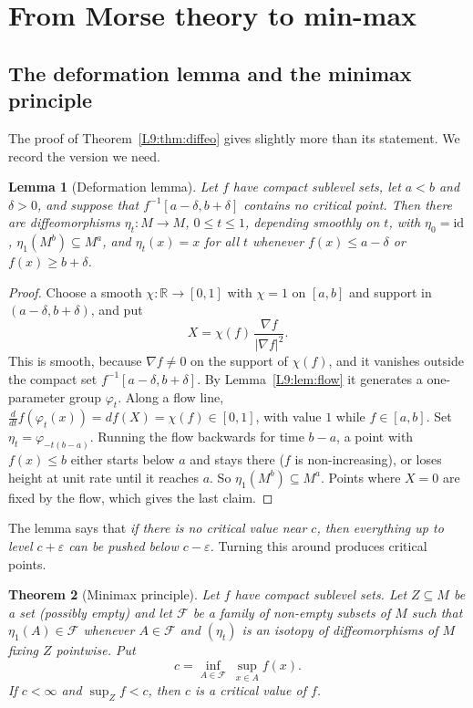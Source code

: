 \documentclass[11pt,openany]{book}
\theoremstyle{plain}
\newtheorem{theorem}{Theorem}[chapter]
\newtheorem{lemma}[theorem]{Lemma}
\theoremstyle{definition}
\theoremstyle{remark}
\newcommand{\R}{\mathbb{R}}
\newcommand{\abs}[1]{\left\lvert #1 \right\rvert}
\begin{document}
\section{From Morse theory to min-max}
\label{TOP:sec:minmax}

\subsection{The deformation lemma and the minimax principle}

The proof of Theorem~\ref{L9:thm:diffeo} gives slightly more than its statement. We record the
version we need.

\begin{lemma}[Deformation lemma]\label{TOP:lem:deform}
Let $f$ have compact sublevel sets, let $a<b$ and $\delta>0$, and suppose that $f^{-1}[a-\delta,b+\delta]$
contains no critical point. Then there are diffeomorphisms $\eta_t\colon M\to M$, $0\le t\le1$,
depending smoothly on $t$, with $\eta_0=\mathrm{id}$, $\eta_1(M^b)\subseteq M^a$, and $\eta_t(x)=x$
for all $t$ whenever $f(x)\le a-\delta$ or $f(x)\ge b+\delta$.
\end{lemma}

\begin{proof}
Choose a smooth $\chi\colon\R\to[0,1]$ with $\chi=1$ on $[a,b]$ and support in $(a-\delta,b+\delta)$, and
put
\[
  X=\chi(f)\,\frac{\nabla f}{\abs{\nabla f}^2}.
\]
This is smooth, because $\nabla f\neq0$ on the support of $\chi(f)$, and it vanishes outside the compact set
$f^{-1}[a-\delta,b+\delta]$. By Lemma~\ref{L9:lem:flow} it generates a one-parameter group $\varphi_t$. Along
a flow line, $\frac{d}{dt}f(\varphi_t(x))=df(X)=\chi(f)\in[0,1]$, with value $1$ while $f\in[a,b]$. Set
$\eta_t=\varphi_{-t(b-a)}$. Running the flow backwards for time $b-a$, a point with $f(x)\le b$ either
starts below $a$ and stays there ($f$ is non-increasing), or loses height at unit rate until it reaches
$a$. So $\eta_1(M^b)\subseteq M^a$. Points where $X=0$ are fixed by the flow, which gives the last claim.
\end{proof}

The lemma says that \emph{if there is no critical value near $c$, then everything up to level $c+\varepsilon$
can be pushed below $c-\varepsilon$.} Turning this around produces critical points.

\begin{theorem}[Minimax principle]\label{TOP:thm:minimax}
Let $f$ have compact sublevel sets. Let $Z\subseteq M$ be a set (possibly empty) and let $\mathcal F$ be a
family of non-empty subsets of $M$ such that $\eta_1(A)\in\mathcal F$ whenever $A\in\mathcal F$ and
$(\eta_t)$ is an isotopy of diffeomorphisms of $M$ fixing $Z$ pointwise. Put
\[
  c=\inf_{A\in\mathcal F}\ \sup_{x\in A}f(x).
\]
If $c<\infty$ and $\sup_Zf<c$, then $c$ is a critical value of $f$.
\end{theorem}
\end{document}
